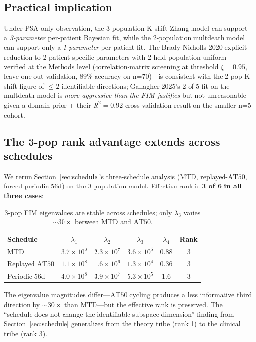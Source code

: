 \documentclass[11pt]{article}
\newcommand{\AT}{\mathrm{AT}}
\begin{document}
\subsection{Practical implication}\label{sec:3pop_implication}

Under PSA-only observation, the 3-population K-shift Zhang model can support a
\emph{3-parameter} per-patient Bayesian fit, while the 2-population multdeath
model can support only a \emph{1-parameter} per-patient fit. The
Brady-Nicholls 2020 explicit reduction to 2 patient-specific parameters with 2
held population-uniform---verified at the Methods level (correlation-matrix
screening at threshold $\xi = 0.95$, leave-one-out validation, 89\% accuracy on
n=70)---is consistent with the 2-pop K-shift figure of $\le 2$ identifiable
directions; Gallagher 2025's 2-of-5 fit on the multdeath model is \emph{more
aggressive than the FIM justifies} but not unreasonable given a domain prior +
their $R^2 = 0.92$ cross-validation result on the smaller n=5 cohort.

\subsection{The 3-pop rank advantage extends across schedules}

We rerun Section~\ref{sec:schedule}'s three-schedule analysis (MTD, replayed-$\AT 50$,
forced-periodic-56d) on the 3-population model. Effective rank is
\textbf{3 of 6 in all three cases}:

\begin{table}[h]
\centering
\begin{tabular}{lccccc}
\toprule
Schedule & $\lambda_1$ & $\lambda_2$ & $\lambda_3$ & $\lambda_4$ & Rank \\
\midrule
MTD & $3.7 \times 10^8$ & $2.3 \times 10^7$ & $3.6 \times 10^5$ & $0.88$ & 3 \\
Replayed $\AT 50$ & $1.1 \times 10^8$ & $1.6 \times 10^6$ & $1.3 \times 10^4$ & $0.36$ & 3 \\
Periodic 56d & $4.0 \times 10^8$ & $3.9 \times 10^7$ & $5.3 \times 10^5$ & $1.6$ & 3 \\
\bottomrule
\end{tabular}
\caption{3-pop FIM eigenvalues are stable across schedules; only $\lambda_3$
varies $\sim 30\times$ between MTD and $\AT 50$.}
\end{table}

The eigenvalue magnitudes differ---$\AT 50$ cycling produces a less informative
third direction by $\sim 30\times$ than MTD---but the effective rank is preserved.
The ``schedule does not change the identifiable subspace dimension'' finding
from Section~\ref{sec:schedule} generalizes from the theory tribe (rank 1) to the
clinical tribe (rank 3).
\end{document}
